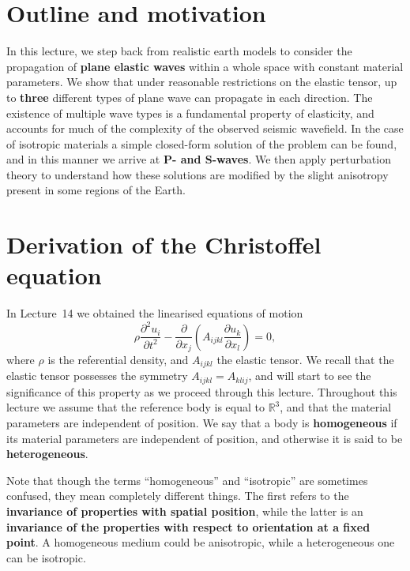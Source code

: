 \section*{Outline and motivation}

In this lecture, we step back from realistic earth models to consider the 
propagation of \textbf{plane elastic waves} within a whole space with constant material parameters.
We show that under reasonable restrictions on the elastic tensor, up to \textbf{three} different types of plane 
wave can propagate in each direction. The existence of multiple wave types is a fundamental property of
elasticity, and accounts for much of the complexity of the observed seismic wavefield. In the case of isotropic 
materials a simple closed-form solution of the problem can be found, and in this manner we 
arrive at \textbf{P- and S-waves}. We then apply perturbation theory to understand how these solutions are modified by 
the slight anisotropy present in some regions of the Earth.

\section*{Derivation of the Christoffel equation}

In Lecture~14 we obtained the linearised equations of motion
\begin{equation}
\rho\frac{\partial^{2}u_{i}}{\partial t^{2}}-\frac{\partial}{\partial x_{j}}\left(A_{ijkl}\frac{\partial u_{k}}{\partial x_{l}}\right)=0,
\label{eq:1}
\end{equation}
where $\rho$ is the referential density, and $A_{ijkl}$ the elastic tensor. We recall that the elastic tensor possesses the symmetry $A_{ijkl}=A_{klij}$, and will start to see the significance of this property as we proceed through this lecture. 
Throughout this lecture we assume that the reference body is equal to $\mathbb{R}^{3}$, and that the material parameters are independent of position. We say that a body is \textbf{homogeneous} if its material parameters 
are independent of position, and otherwise it is said to be \textbf{heterogeneous}.

Note that though the terms ``homogeneous'' and ``isotropic'' are sometimes confused, they mean completely different things. The first refers to the 
\textbf{invariance of properties with spatial position}, while the latter is an \textbf{invariance of the
 properties with respect to orientation at a fixed point}. 
A homogeneous medium could be anisotropic, while a heterogeneous one can be isotropic.


